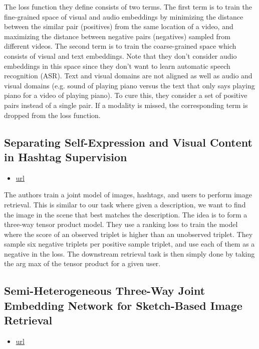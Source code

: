 The loss function they define consists of two terms. The first term is to train the fine-grained space of visual and audio embeddings by minimizing the distance between the similar pair (positives) from the same location of a video, and maximizing the distance between negative pairs (negatives) sampled from different videos. The second term is to train the coarse-grained space which consists of visual and text embeddings. Note that they don't consider audio embeddings in this space since they don't want to learn automatic speech recognition (ASR). Text and visual domains are not aligned as well as audio and visual domains (e.g. sound of playing piano versus the text that only says playing piano for a video of playing piano). To cure this, they consider a set of positive pairs instead of a single pair.
If a modality is missed, the corresponding term is dropped from the loss function.

\subsection{Separating Self-Expression and Visual Content in Hashtag Supervision}

\begin{itemize}
\item \href{https://openaccess.thecvf.com/content\_cvpr\_2018/papers/Veit\_Separating\_Self-Expression\_and\_CVPR\_2018\_paper.pdf}{url}
\end{itemize}

The authors train a joint model of images, hashtags, and users to perform image retrieval. This is similar to our task where given a description, we want to find the image in the scene that best matches the description. The idea is to form a three-way tensor product model. They use a ranking loss to train the model where the score of an observed triplet is higher than an unobserved triplet. They sample six negative triplets per positive sample triplet, and use each of them as a negative in the loss.
The downstream retrieval task is then simply done by taking the arg max of the tensor product for a given user.



\subsection{Semi-Heterogeneous Three-Way Joint Embedding Network for Sketch-Based Image Retrieval}

\begin{itemize}
\item \href{https://ieeexplore.ieee.org/document/8809264}{url}
\end{itemize}

